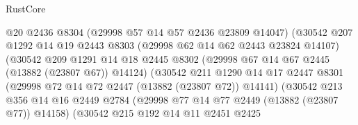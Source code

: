\begin{lexlean}{RustCore}
\begin{coremodule}
                                      @20
                                      @2436
                                      @8304
                                      (@29998 @57 @14 @57 @2436 @23809 @14047)
                                      (@30542
                                        @207
                                        @1292
                                        @14
                                        @19
                                        @2443
                                        @8303
                                        (@29998 @62 @14 @62 @2443 @23824 @14107)
                                        (@30542
                                          @209
                                          @1291
                                          @14
                                          @18
                                          @2445
                                          @8302
                                          (@29998 @67 @14 @67 @2445 (@13882 (@23807 @67)) @14124)
                                          (@30542
                                            @211
                                            @1290
                                            @14
                                            @17
                                            @2447
                                            @8301
                                            (@29998 @72 @14 @72 @2447 (@13882 (@23807 @72)) @14141)
                                            (@30542
                                              @213
                                              @356
                                              @14
                                              @16
                                              @2449
                                              @2784
                                              (@29998
                                                @77
                                                @14
                                                @77
                                                @2449
                                                (@13882 (@23807 @77))
                                                @14158)
                                              (@30542
                                                @215
                                                @192
                                                @14
                                                @11
                                                @2451
                                                @2425

\end{coremodule}
\end{lexlean}

